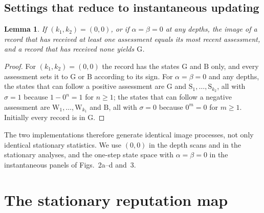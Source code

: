 \documentclass[fleqn,10pt]{article}
\theoremstyle{plain}
\newtheorem{lemma}[proposition]{Lemma}
\theoremstyle{remark}
\newcommand{\FigRecognition}{2}
\newcommand{\FigStrategy}{3}
\newcommand{\G}{\mathrm G}
\newcommand{\B}{\mathrm B}
\newcommand{\W}{\mathrm W}
\renewcommand{\S}{\mathrm S}
\begin{document}
\subsection{Settings that reduce to instantaneous updating}
\begin{lemma}\label{lem:instantaneous}
If $(k_1,k_2)=(0,0)$, or if $\alpha=\beta=0$ at any depths, the image of a record
that has received at least one assessment equals its most recent assessment,
and a record that has received none yields $\G$.
\end{lemma}
\begin{proof}
For $(k_1,k_2)=(0,0)$ the record has the states $\G$ and $\B$ only, and every
assessment sets it to $\G$ or $\B$ according to its sign. For $\alpha=\beta=0$
and any depths, the states that can follow a positive assessment are $\G$ and
$\S_1,\dots,\S_{k_2}$, all with $\sigma=1$ because $1-0^n=1$ for $n\ge1$; the
states that can follow a negative assessment are $\W_1,\dots,\W_{k_1}$ and $\B$,
all with $\sigma=0$ because $0^m=0$ for $m\ge1$. Initially every record is in
$\G$.
\end{proof}
The two implementations therefore generate identical image processes, not
only identical stationary statistics. We use $(0,0)$ in the depth scans and in
the stationary analyses, and the one-step state space with $\alpha=\beta=0$ in
the instantaneous panels of Figs.~\FigRecognition a--d and~\FigStrategy.

\section{The stationary reputation map}
\label{sec:map}
\end{document}
